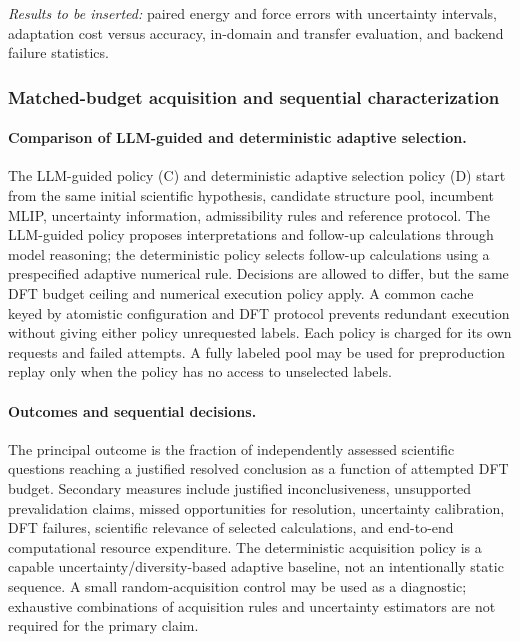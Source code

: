 \documentclass[11pt,a4paper]{article}
\begin{document}
\textcolor{red!80!black}{\emph{Results to be inserted:} paired energy and force errors with uncertainty intervals, adaptation cost versus accuracy, in-domain and transfer evaluation, and backend failure statistics.}

\subsubsection{Matched-budget acquisition and sequential characterization}
\label{sec:results:adaptive_policy}
\paragraph{Comparison of LLM-guided and deterministic adaptive selection.}
The LLM-guided policy (C) and deterministic adaptive selection policy (D) start from the same initial scientific hypothesis, candidate structure pool, incumbent MLIP, uncertainty information, admissibility rules and reference protocol. The LLM-guided policy proposes interpretations and follow-up calculations through model reasoning; the deterministic policy selects follow-up calculations using a prespecified adaptive numerical rule. Decisions are allowed to differ, but the same DFT budget ceiling and numerical execution policy apply. A common cache keyed by atomistic configuration and DFT protocol prevents redundant execution without giving either policy unrequested labels. Each policy is charged for its own requests and failed attempts. A fully labeled pool may be used for preproduction replay only when the policy has no access to unselected labels.

\paragraph{Outcomes and sequential decisions.}
The principal outcome is the fraction of independently assessed scientific questions reaching a justified resolved conclusion as a function of attempted DFT budget. Secondary measures include justified inconclusiveness, unsupported prevalidation claims, missed opportunities for resolution, uncertainty calibration, DFT failures, scientific relevance of selected calculations, and end-to-end computational resource expenditure. The deterministic acquisition policy is a capable uncertainty/diversity-based adaptive baseline, not an intentionally static sequence. A small random-acquisition control may be used as a diagnostic; exhaustive combinations of acquisition rules and uncertainty estimators are not required for the primary claim.
\end{document}
